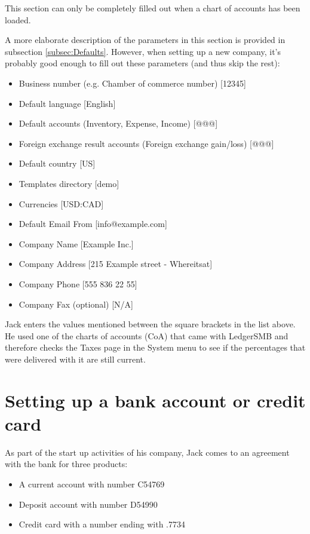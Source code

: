 This section can only be completely filled out when a chart of accounts has been loaded.

A more elaborate description of the parameters in this section is provided in subsection
\ref{subsec:Defaults}. However, when setting up a new company, it's probably good enough
to fill out these parameters (and thus skip the rest):

\begin{itemize}
\item Business number (e.g. Chamber of commerce number) [12345]
\item Default language [English]
\item Default accounts (Inventory, Expense, Income) [@@@]
\item Foreign exchange result accounts (Foreign exchange gain/loss) [@@@]
\item Default country [US]
\item Templates directory [demo]
\item Currencies [USD:CAD]
\item Default Email From [info@example.com]
\item Company Name [Example Inc.]
\item Company Address [215 Example street - Whereitsat]
\item Company Phone [555 836 22 55]
\item Company Fax (optional) [N/A]
\end{itemize}

Jack enters the values mentioned between the square brackets in the list above. 
He used one of the charts of accounts (CoA) that came with LedgerSMB and therefore
checks the Taxes page in the System menu to see if the percentages that were delivered
with it are still current.

\section{Setting up a bank account or credit card}

As part of the start up activities of his company, Jack comes to an agreement with the
bank for three products:

\begin{itemize}
\item A current account with number C54769
\item Deposit account with number D54990
\item Credit card with a number ending with .7734
\end{itemize}

